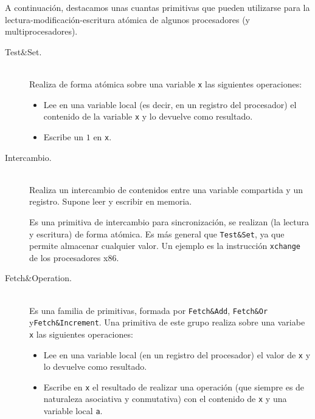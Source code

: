 A continuación, destacamos unas cuantas primitivas que pueden utilizarse para la lectura-modificación-escritura atómica de algunos procesadores (y multiprocesadores).
\begin{description}
    \item [Test\&Set.]~\\
        Realiza de forma atómica sobre una variable \verb|x| las siguientes operaciones:
        \begin{itemize}
            \item Lee en una variable local (es decir, en un registro del procesador) el contenido de la variable \verb|x| y lo devuelve como resultado.
            \item Escribe un $1$ en \verb|x|.
        \end{itemize}
    \item [Intercambio.]~\\
        Realiza un intercambio de contenidos entre una variable compartida y un registro. Supone leer y escribir en memoria. 

        Es una primitiva de intercambio para sincronización, se realizan (la lectura y escritura) de forma atómica. Es más general que \verb|Test&Set|, ya que permite almacenar cualquier valor. Un ejemplo es la instrucción \verb|xchange| de los procesadores x86.
    \item [Fetch\&Operation.]~\\
        Es una familia de primitivas, formada por \verb|Fetch&Add|, \verb|Fetch&Or| y\newline \verb|Fetch&Increment|. Una primitiva de este grupo realiza sobre una variabe \verb|x| las siguientes operaciones:
        \begin{itemize}
            \item Lee en una variable local (en un registro del procesador) el valor de \verb|x| y lo devuelve como resultado.
            \item Escribe en \verb|x| el resultado de realizar una operación (que siempre es de naturaleza asociativa y conmutativa) con el contenido de \verb|x| y una variable local \verb|a|.


\end{itemize}
\end{description}
